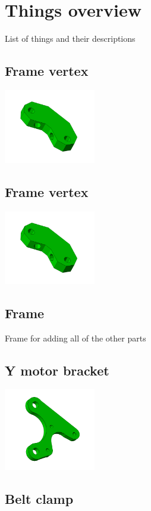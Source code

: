 \documentclass[11pt]{article}
\begin{document}
\section{Things overview}
List of things and their descriptions
\subsection{Frame vertex}


\includegraphics[width=4cm]{images/frame-vertex.jpg}
\subsection{Frame vertex}


\includegraphics[width=4cm]{images/frame-vertex.jpg}
\subsection{Frame}
Frame for adding all of the other parts

\subsection{Y motor bracket}


\includegraphics[width=4cm]{images/y-motor-bracket.jpg}
\subsection{Belt clamp}
\end{document}

